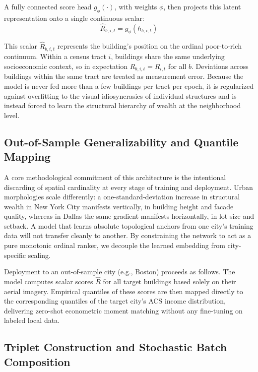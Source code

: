 \documentclass{article}
\begin{document}
A fully connected score head $g_\phi(\cdot)$, with weights $\phi$, then projects this latent representation onto a single continuous scalar:
\begin{equation}
\hat{R}_{b,i,t} = g_\phi(h_{b,i,t})
\end{equation}

This scalar $\hat{R}_{b,i,t}$ represents the building's position on the ordinal poor-to-rich continuum. Within a census tract $i$, buildings share the same underlying socioeconomic context, so in expectation $\hat{R}_{b,i,t} = \hat{R}_{i,t}$ for all $b$. Deviations across buildings within the same tract are treated as measurement error. Because the model is never fed more than a few buildings per tract per epoch, it is regularized against overfitting to the visual idiosyncrasies of individual structures and is instead forced to learn the structural hierarchy of wealth at the neighborhood level.

\subsection{Out-of-Sample Generalizability and Quantile Mapping}

A core methodological commitment of this architecture is the intentional discarding of spatial cardinality at every stage of training and deployment. Urban morphologies scale differently: a one-standard-deviation increase in structural wealth in New York City manifests vertically, in building height and facade quality, whereas in Dallas the same gradient manifests horizontally, in lot size and setback. A model that learns absolute topological anchors from one city's training data will not transfer cleanly to another. By constraining the network to act as a pure monotonic ordinal ranker, we decouple the learned embedding from city-specific scaling.

Deployment to an out-of-sample city (e.g., Boston) proceeds as follows. The model computes scalar scores $\hat{R}$ for all target buildings based solely on their aerial imagery. Empirical quantiles of these scores are then mapped directly to the corresponding quantiles of the target city's ACS income distribution, delivering zero-shot econometric moment matching without any fine-tuning on labeled local data.

\subsection{Triplet Construction and Stochastic Batch Composition}
\end{document}
